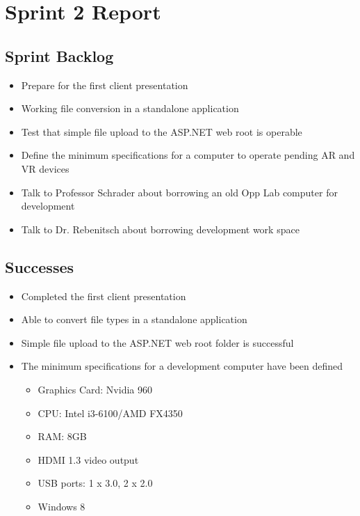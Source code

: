
\section{Sprint 2 Report}
\label{sec:Sprint2_report}
    \subsection{Sprint Backlog}
    \label{sec:Sprint2_backlog}
    \begin{itemize}
        \item Prepare for the first client presentation
        \item Working file conversion in a standalone application
        \item Test that simple file upload to the ASP.NET web root is operable
        \item Define the minimum specifications for a computer to operate pending AR and VR devices
        \item Talk to Professor Schrader about borrowing an old Opp Lab computer for development
        \item Talk to Dr. Rebenitsch about borrowing development work space 
    \end{itemize}

    \subsection{Successes}
    \label{sec:Sprint2_successes}
        \begin{itemize}
            \item Completed the first client presentation
            \item Able to convert file types in a standalone application
            \item Simple file upload to the ASP.NET web root folder is successful
            \item The minimum specifications for a development computer have been defined
            \begin{itemize}
                \item Graphics Card: Nvidia 960
                \item CPU: Intel i3-6100/AMD FX4350
                \item RAM: 8GB
                \item HDMI 1.3 video output
                \item USB ports: 1 x 3.0, 2 x 2.0
                \item Windows 8 
            \end{itemize}
        \end{itemize}

